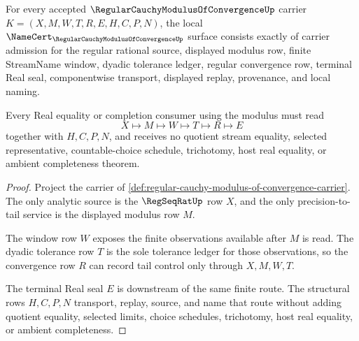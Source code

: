 \begin{theorem}
\label{thm:regular-cauchy-modulus-of-convergence-namecert-obligations}
For every accepted $\RegularCauchyModulusOfConvergenceUp$ carrier $K=(X,M,W,T,R,E,H,C,P,N)$, the local $\NameCert_{\RegularCauchyModulusOfConvergenceUp}$ surface consists exactly of carrier admission for the regular rational source, displayed modulus row, finite StreamName window, dyadic tolerance ledger, regular convergence row, terminal Real seal, componentwise transport, displayed replay, provenance, and local naming.

Every Real equality or completion consumer using the modulus must read
$$
X\longmapsto M\longmapsto W\longmapsto T\longmapsto R\longmapsto E
$$
together with $H,C,P,N$, and receives no quotient stream equality, selected representative, countable-choice schedule, trichotomy, host real equality, or ambient completeness theorem.
\end{theorem}
\begin{proof}
Project the carrier of \autoref{def:regular-cauchy-modulus-of-convergence-carrier}. The only analytic source is the $\RegSeqRatUp$ row $X$, and the only precision-to-tail service is the displayed modulus row $M$.

The window row $W$ exposes the finite observations available after $M$ is read. The dyadic tolerance row $T$ is the sole tolerance ledger for those observations, so the convergence row $R$ can record tail control only through $X,M,W,T$.

The terminal Real seal $E$ is downstream of the same finite route. The structural rows $H,C,P,N$ transport, replay, source, and name that route without adding quotient equality, selected limits, choice schedules, trichotomy, host real equality, or ambient completeness.
\end{proof}

